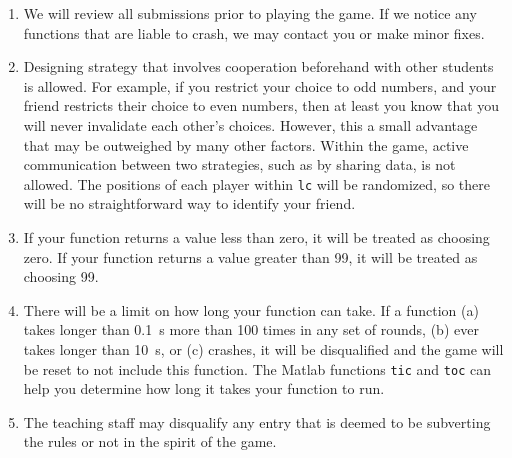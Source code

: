 \documentclass[12pt]{amsart}
\begin{document}
\begin{enumerate}
  \item We will review all submissions prior to playing the game. If we notice
    any functions that are liable to crash, we may contact you or make minor
    fixes.\\
  \item Designing strategy that involves cooperation beforehand with other
    students is allowed. For example, if you restrict your choice to odd
    numbers, and your friend restricts their choice to even numbers, then at
    least you know that you will never invalidate each other's choices.
    However, this a small advantage that may be outweighed by many other
    factors. Within the game, active communication between two strategies, such
    as by sharing data, is not allowed. The positions of each player within
    \texttt{lc} will be randomized, so there will be no straightforward way to
    identify your friend.\\
  \item If your function returns a value less than zero, it will be treated
    as choosing zero. If your function returns a value greater than 99, it will
    be treated as choosing 99.\\
  \item There will be a limit on how long your function can take. If a function
    (a) takes longer than 0.1~s more than 100 times in any set of rounds, (b)
    ever takes longer than 10~s, or (c) crashes, it will be disqualified and
    the game will be reset to not include this function.   The Matlab functions \texttt{tic} and \texttt{toc} can help you determine how long it takes your function to run.\\
  \item The teaching staff may disqualify any entry that is deemed to be
    subverting the rules or not in the spirit of the game.
\end{enumerate}








%
%
\end{document}
